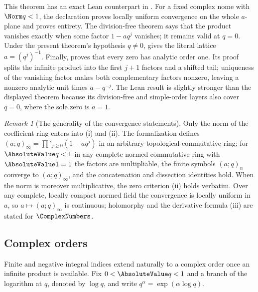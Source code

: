 \documentclass[11pt,a4paper,oneside,openany]{book}
\theoremstyle{definition}
\theoremstyle{remark}
\newtheorem{remark}[remark]{Remark}
\begin{document}
This theorem has an exact Lean counterpart in
.  For a fixed complex nome with
$\Norm q<1$, the declaration
 proves locally
uniform convergence on the whole $a$-plane and
 proves entirety.  The
division-free theorem
 says
that the product vanishes exactly when some factor $1-aq^j$ vanishes; it
remains valid at $q=0$.  Under the present theorem's hypothesis $q\ne0$,
gives the
literal lattice $a=(q^j)^{-1}$.  Finally,
proves that
every zero has analytic order one.  Its proof splits the infinite product
into the first $j+1$ factors and a shifted tail; uniqueness of the vanishing
factor makes both complementary factors nonzero, leaving a nonzero analytic
unit times $a-q^{-j}$.  The Lean result is slightly stronger than the
displayed theorem because its division-free and simple-order layers also
cover $q=0$, where the sole zero is $a=1$.

\begin{remark}[The generality of the convergence statements]\label{rem:poch-entire-generality}
Only the norm of the coefficient ring enters into (i) and (ii).  The formalization defines $(a;q)_\infty=\prod'_{j\ge0}(1-aq^j)$ in an arbitrary topological commutative ring; for $\AbsoluteValue q<1$ in any complete normed commutative ring with $\AbsoluteValue1=1$ the factors are multipliable, the finite symbols $(a;q)_n$ converge to $(a;q)_\infty$, and the concatenation and dissection identities hold.  When the norm is moreover multiplicative, the zero criterion (ii) holds verbatim.  Over any complete, locally compact normed field the convergence is locally uniform in $a$, so $a\mapsto(a;q)_\infty$ is continuous; holomorphy and the derivative formula (iii) are stated for $\ComplexNumbers$.
\end{remark}

\subsection{Complex orders}

Finite and negative integral indices extend naturally to a complex order once an infinite product is available.  Fix $0<\AbsoluteValue q<1$ and a branch of the logarithm at $q$, denoted by $\log q$, and write $q^\alpha=\exp(\alpha\log q)$.
\end{document}
